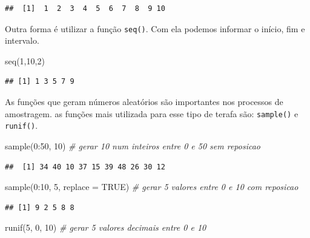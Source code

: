 \documentclass[
]{book}
\newenvironment{Shaded}{\begin{snugshade}}{\end{snugshade}}
\newcommand{\AttributeTok}[1]{\textcolor[rgb]{0.77,0.63,0.00}{#1}}
\newcommand{\CommentTok}[1]{\textcolor[rgb]{0.56,0.35,0.01}{\textit{#1}}}
\newcommand{\ConstantTok}[1]{\textcolor[rgb]{0.00,0.00,0.00}{#1}}
\newcommand{\DecValTok}[1]{\textcolor[rgb]{0.00,0.00,0.81}{#1}}
\newcommand{\FunctionTok}[1]{\textcolor[rgb]{0.00,0.00,0.00}{#1}}
\newcommand{\NormalTok}[1]{#1}
\newcommand{\SpecialCharTok}[1]{\textcolor[rgb]{0.00,0.00,0.00}{#1}}
\begin{document}
\begin{verbatim}
##  [1]  1  2  3  4  5  6  7  8  9 10
\end{verbatim}

Outra forma é utilizar a função \texttt{seq()}. Com ela podemos informar o início, fim e intervalo.

\begin{Shaded}
\begin{Highlighting}[]
\FunctionTok{seq}\NormalTok{(}\DecValTok{1}\NormalTok{,}\DecValTok{10}\NormalTok{,}\DecValTok{2}\NormalTok{)}
\end{Highlighting}
\end{Shaded}

\begin{verbatim}
## [1] 1 3 5 7 9
\end{verbatim}

As funções que geram números aleatórios são importantes nos processos de amostragem. as funções mais utilizada para esse tipo de terafa são: \texttt{sample()} e \texttt{runif()}.

\begin{Shaded}
\begin{Highlighting}[]
\FunctionTok{sample}\NormalTok{(}\DecValTok{0}\SpecialCharTok{:}\DecValTok{50}\NormalTok{, }\DecValTok{10}\NormalTok{) }\CommentTok{\# gerar 10 num inteiros entre 0 e 50 sem reposicao}
\end{Highlighting}
\end{Shaded}

\begin{verbatim}
##  [1] 34 40 10 37 15 39 48 26 30 12
\end{verbatim}

\begin{Shaded}
\begin{Highlighting}[]
\FunctionTok{sample}\NormalTok{(}\DecValTok{0}\SpecialCharTok{:}\DecValTok{10}\NormalTok{, }\DecValTok{5}\NormalTok{, }\AttributeTok{replace =} \ConstantTok{TRUE}\NormalTok{) }\CommentTok{\# gerar 5 valores entre 0 e 10 com reposicao}
\end{Highlighting}
\end{Shaded}

\begin{verbatim}
## [1] 9 2 5 8 8
\end{verbatim}

\begin{Shaded}
\begin{Highlighting}[]
\FunctionTok{runif}\NormalTok{(}\DecValTok{5}\NormalTok{, }\DecValTok{0}\NormalTok{, }\DecValTok{10}\NormalTok{) }\CommentTok{\# gerar 5 valores decimais entre 0 e 10}
\end{Highlighting}
\end{Shaded}
\end{document}

